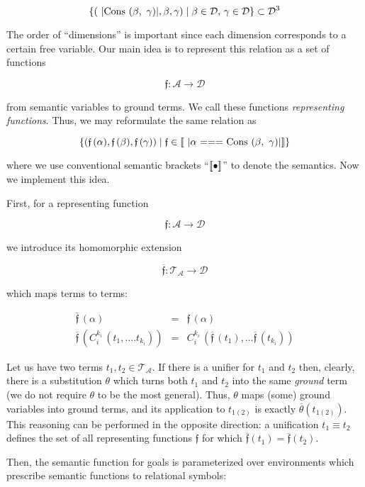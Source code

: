 \[
\{(\mbox{\lstinline|Cons ($\beta$, $\,\gamma$)|}, \beta, \gamma) \mid \beta\in\mathcal{D},\,\gamma\in\mathcal{D}\}\subset\mathcal{D}^3
\]

The order of ``dimensions'' is important since each dimension corresponds to a certain free variable. Our main idea is to represent this relation as a set of functions 

\[
\mathfrak{f}:\mathcal{A}\to\mathcal{D}
\]

from semantic variables to ground terms. We call these functions \emph{representing functions}. Thus, we may reformulate the same relation as

\[
\{(\mathfrak{f}\,(\alpha),\mathfrak{f}\,(\beta),\mathfrak{f}\,(\gamma))\mid\mathfrak{f}\in\sembr{\mbox{\lstinline|$\alpha$ === Cons ($\beta$, $\,\gamma$)|}}\}
\]

where we use conventional semantic brackets ``$\llbracket{\bullet}\rrbracket$'' to denote the semantics. Now we implement this idea.

First, for a representing function

\[
\mathfrak{f} : \mathcal{A}\to\mathcal{D}
\]

we introduce its homomorphic extension 

\[
  \overline{\mathfrak{f}}:\mathcal{T_A}\to\mathcal{D}
\]

which maps terms to terms:

\[
\begin{array}{rcl}

  \overline{\mathfrak f}\,(\alpha) & = & \mathfrak f\,(\alpha)\\
  \overline{\mathfrak f}\,(C_i^{k_i}\,(t_1,\dots.t_{k_i})) & = & C_i^{k_i}\,(\overline{\mathfrak f}\,(t_1),\dots \overline{\mathfrak f}\,(t_{k_i}))
\end{array}
\]

Let us have two terms $t_1, t_2\in\mathcal{T_A}$. If there is a unifier for $t_1$ and $t_2$ then, clearly, there is a substitution $\theta$ which
turns both $t_1$ and $t_2$ into the same \emph{ground} term (we do not require $\theta$ to be the most general). Thus, $\theta$ maps
(some) ground variables into ground terms, and its application to $t_{1(2)}$ is exactly $\overline{\theta}(t_{1(2)})$. This reasoning can be
performed in the opposite direction: a unification $t_1\equiv t_2$ defines the set of all representing functions $\mathfrak{f}$ for which
$\overline{\mathfrak{f}}(t_1)=\overline{\mathfrak{f}}(t_2)$. 

Then, the semantic function for goals is parameterized over environments which prescribe semantic functions to relational symbols:

